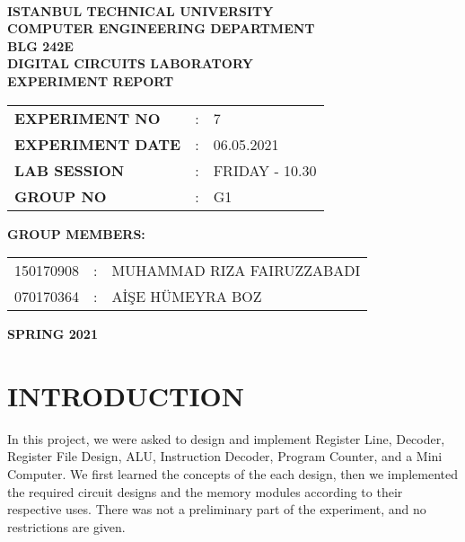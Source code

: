\documentclass[pdftex,12pt,a4paper]{article}
\begin{document}
\begin{titlepage}
\begin{center}
\textbf{}\\
\textbf{\Large{ISTANBUL TECHNICAL UNIVERSITY}}\\
\vspace{0.5cm}
\textbf{\Large{COMPUTER ENGINEERING DEPARTMENT}}\\
\vspace{2cm}
\textbf{\Large{BLG 242E\\ DIGITAL CIRCUITS LABORATORY\\ EXPERIMENT REPORT}}\\
\vspace{2.8cm}
\begin{table}[ht]
\centering
\Large{
\begin{tabular}{lcl}
\textbf{EXPERIMENT NO}  & : & 7 \\
\textbf{EXPERIMENT DATE}  & : & 06.05.2021 \\
\textbf{LAB SESSION}  & : & FRIDAY - 10.30 \\
\textbf{GROUP NO}  & : & G1 \\
\end{tabular}}
\end{table}
\vspace{1cm}
\textbf{\Large{GROUP MEMBERS:}}\\
\begin{table}[ht]
\centering
\Large{
\begin{tabular}{rcl}
150170908  & : & MUHAMMAD RIZA FAIRUZZABADI \\
070170364  & : & AİŞE HÜMEYRA BOZ \\
\end{tabular}}
\end{table}
\vspace{2.8cm}
\textbf{\Large{SPRING 2021}}

\end{center}

\end{titlepage}

\thispagestyle{empty}
\setcounter{tocdepth}{4}
\tableofcontents
\clearpage

\setcounter{page}{1}






\section{INTRODUCTION}
In this project, we were asked  to design and implement Register Line, Decoder, Register File Design, ALU, Instruction Decoder, Program Counter, and a Mini Computer. We first learned the concepts of the each design, then we implemented the required circuit designs and the memory modules according to their respective uses. There was not a preliminary part of the experiment, and no restrictions are given.
\end{document}
